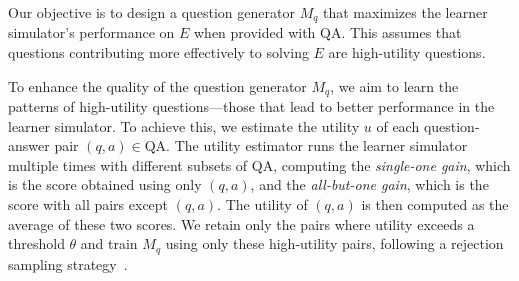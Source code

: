 Our objective is to design a question generator \( M_q \) that maximizes the learner simulator's performance on \( E \) when provided with \( \text{QA} \). 
This assumes that questions contributing more effectively to solving \( E \) are high-utility questions.

To enhance the quality of the question generator \( M_q \), we aim to learn the patterns of high-utility questions—those that lead to better performance in the learner simulator.
To achieve this, we estimate the utility \( u \) of each question-answer pair \( (q, a) \in \text{QA} \).
The utility estimator runs the learner simulator multiple times with different subsets of QA, computing the \textit{single-one gain}, which is the score obtained using only \( (q, a) \), and the \textit{all-but-one gain}, which is the score with all pairs except \( (q, a) \).
The utility of \( (q, a) \) is then computed as the average of these two scores.
We retain only the pairs where utility exceeds a threshold \( \theta \) and train \( M_q \) using only these high-utility pairs, following a rejection sampling strategy~\cite{bai2022constitutional}.


